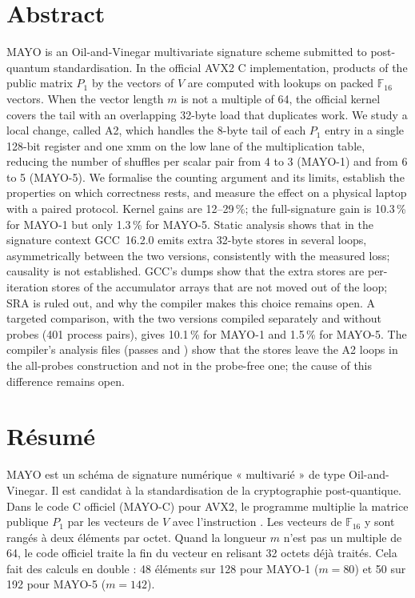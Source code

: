 \chapter*{Abstract}
MAYO is an Oil-and-Vinegar multivariate signature scheme submitted to post-quantum standardisation. In the official AVX2 C implementation, products of the public matrix $P_1$ by the vectors of $V$ are computed with  lookups on packed $\mathbb{F}_{16}$ vectors. When the vector length $m$ is not a multiple of 64, the official kernel covers the tail with an overlapping 32-byte load that duplicates work. We study a local change, called A2, which handles the 8-byte tail of each $P_1$ entry in a single 128-bit register and one xmm  on the low lane of the multiplication table, reducing the number of shuffles per scalar pair from 4 to 3 (MAYO-1) and from 6 to 5 (MAYO-5). We formalise the counting argument and its limits, establish the properties on which correctness rests, and measure the effect on a physical laptop with a paired protocol. Kernel gains are 12--29\,\%; the full-signature gain is 10.3\,\% for MAYO-1 but only 1.3\,\% for MAYO-5. Static analysis shows that in the signature context GCC~16.2.0 emits extra 32-byte stores in several loops, asymmetrically between the two versions, consistently with the measured loss; causality is not established. GCC's dumps show that the extra stores are per-iteration stores of the accumulator arrays that are not moved out of the loop; SRA is ruled out, and why the compiler makes this choice remains open. A targeted comparison, with the two versions compiled separately and without probes (401 process pairs), gives 10.1\,\% for MAYO-1 and 1.5\,\% for MAYO-5. The compiler's analysis files (passes  and ) show that the stores leave the A2 loops in the all-probes construction and not in the probe-free one; the cause of this difference remains open.


\chapter*{Résumé}
MAYO est un schéma de signature numérique « multivarié » de type Oil-and-Vinegar. Il est candidat à la standardisation de la cryptographie post-quantique. Dans le code C officiel (MAYO-C) pour AVX2, le programme multiplie la matrice publique $P_1$ par les vecteurs de $V$ avec l'instruction . Les vecteurs de $\mathbb{F}_{16}$ y sont rangés à deux éléments par octet. Quand la longueur $m$ n'est pas un multiple de 64, le code officiel traite la fin du vecteur en relisant 32 octets déjà traités. Cela fait des calculs en double : 48 éléments sur 128 pour MAYO-1 ($m=80$) et 50 sur 192 pour MAYO-5 ($m=142$).

